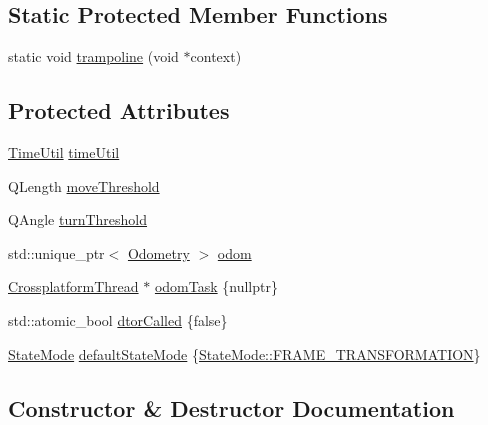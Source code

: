 \subsection*{Static Protected Member Functions}
\begin{DoxyCompactItemize}
\item 
static void \mbox{\hyperlink{classokapi_1_1OdomChassisController_a11be9684a858686cfc3204b493422308}{trampoline}} (void $\ast$context)
\end{DoxyCompactItemize}
\subsection*{Protected Attributes}
\begin{DoxyCompactItemize}
\item 
\mbox{\hyperlink{classokapi_1_1TimeUtil}{Time\+Util}} \mbox{\hyperlink{classokapi_1_1OdomChassisController_a3afde0b7a16a998873923f41fedb041a}{time\+Util}}
\item 
Q\+Length \mbox{\hyperlink{classokapi_1_1OdomChassisController_a8fc34ac66535e1a2afaf8856f09a9f95}{move\+Threshold}}
\item 
Q\+Angle \mbox{\hyperlink{classokapi_1_1OdomChassisController_ac0d74721713d2928a047562675ae25ef}{turn\+Threshold}}
\item 
std\+::unique\+\_\+ptr$<$ \mbox{\hyperlink{classokapi_1_1Odometry}{Odometry}} $>$ \mbox{\hyperlink{classokapi_1_1OdomChassisController_a7167160f48f0f75fb1bc7964c4cc608b}{odom}}
\item 
\mbox{\hyperlink{classCrossplatformThread}{Crossplatform\+Thread}} $\ast$ \mbox{\hyperlink{classokapi_1_1OdomChassisController_a75246d7a17442c9a63afaef68bbf95e0}{odom\+Task}} \{nullptr\}
\item 
std\+::atomic\+\_\+bool \mbox{\hyperlink{classokapi_1_1OdomChassisController_a2af36f833e8ac382c4386f729f904bae}{dtor\+Called}} \{false\}
\item 
\mbox{\hyperlink{namespaceokapi_af37fbd761bd859a00ff4dd4a87dd8c07}{State\+Mode}} \mbox{\hyperlink{classokapi_1_1OdomChassisController_a762ce2bcc4cdbfd0c6bd296ba21a4c4d}{default\+State\+Mode}} \{\mbox{\hyperlink{namespaceokapi_af37fbd761bd859a00ff4dd4a87dd8c07ad5ed7666e5cebf60d3af20a5a46edf3b}{State\+Mode\+::\+F\+R\+A\+M\+E\+\_\+\+T\+R\+A\+N\+S\+F\+O\+R\+M\+A\+T\+I\+ON}}\}
\end{DoxyCompactItemize}


\subsection{Constructor \& Destructor Documentation}
\mbox{\label{classokapi_1_1OdomChassisController_a3a550eef9b0030b6057eeaf8c5a3bb51}} 

